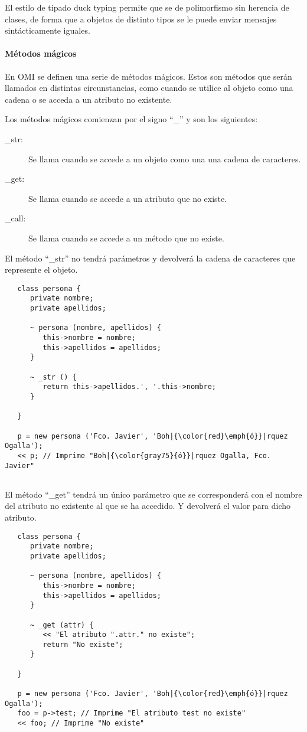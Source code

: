 El estilo de tipado duck typing permite que se de polimorfismo sin herencia de 
clases, de forma que a objetos de distinto tipos se le puede enviar mensajes sintácticamente iguales.  

\paragraph {Métodos mágicos} \label{sec:magic_method}

En OMI se definen una serie de métodos mágicos. Estos son métodos que serán 
llamados en distintas circunstancias, como cuando se utilice al objeto 
como una cadena o se acceda a un atributo no existente. 

Los métodos mágicos comienzan por el signo ``\_'' y son los siguientes: 

\begin{description}
\item[\_str:] Se llama cuando se accede a un objeto como una una cadena de caracteres.
\item[\_get:] Se llama cuando se accede a un atributo que no existe.
\item[\_call:] Se llama cuando se accede a un método que no existe.
\end{description}

El método ``\_str'' no tendrá parámetros y devolverá la cadena de caracteres que
represente el objeto. 

\begin{lstlisting}
   class persona {
      private nombre;
      private apellidos;
      
      ~ persona (nombre, apellidos) {
         this->nombre = nombre;
         this->apellidos = apellidos;
      }
      
      ~ _str () {
         return this->apellidos.', '.this->nombre;
      }
      
   }
   
   p = new persona ('Fco. Javier', 'Boh|{\color{red}\emph{ó}}|rquez Ogalla');
   << p; // Imprime "Boh|{\color{gray75}{ó}}|rquez Ogalla, Fco. Javier"
   
\end{lstlisting}

El método ``\_get'' tendrá un único parámetro que se corresponderá con 
el nombre del atributo no existente al que se ha accedido. Y devolverá 
el valor para dicho atributo. \\

\begin{lstlisting}
   class persona {
      private nombre;
      private apellidos;
      
      ~ persona (nombre, apellidos) {
         this->nombre = nombre;
         this->apellidos = apellidos;
      }
      
      ~ _get (attr) {
         << "El atributo ".attr." no existe";
         return "No existe";
      }
      
   }
   
   p = new persona ('Fco. Javier', 'Boh|{\color{red}\emph{ó}}|rquez Ogalla');
   foo = p->test; // Imprime "El atributo test no existe"
   << foo; // Imprime "No existe"
\end{lstlisting}

